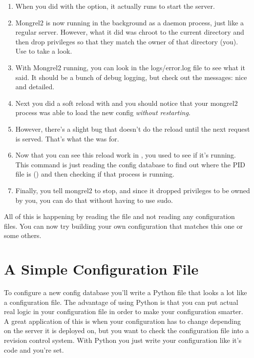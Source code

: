 \begin{enumerate}
\item When you did  with the  option, it actually runs
     to start the server.
\item Mongrel2 is now running in the background as a daemon process, just like a regular server.
    However, what it did was chroot to the current directory and then drop privileges so that
    they match the owner of that directory (you).  Use  to take a look.
\item With Mongrel2 running, you can look in the logs/error.log file to see what it said.  It should
    be a bunch of debug logging, but check out the messages: nice and detailed.
\item Next you did a soft reload with  and you should notice that your mongrel2
    process was able to load the new config \emph{without restarting}.
\item However, there's a slight bug that doesn't do the reload until the next request is served. That's
    what the  was for.
\item Now that you can see this reload work in , you used  to
    see if it's running.  This command is just reading the config database to find out where the PID file
    is () and then checking if that process is running.
\item Finally, you tell mongrel2 to stop, and since it dropped privileges to be owned by you, you can do
    that without having to use sudo.
\end{enumerate}

All of this is happening by reading the  file and not reading any configuration
files.  You can now try building your own configuration that matches this one or some others.


\section{A Simple Configuration File}

To configure a new config database you'll write a Python file that looks a lot like
a configuration file.  The advantage of using Python is that you can put actual
real logic in your configuration file in order to make your configuration smarter.
A great application of this is when your configuration has to change depending on the
server it is deployed on, but you want to check the configuration file into a revision
control system.  With Python you just write your configuration like it's code and
you're set.

